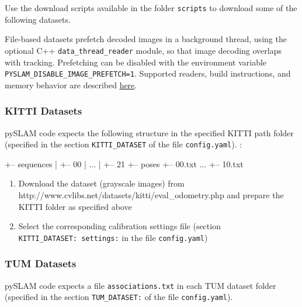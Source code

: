 \documentclass{article}
\newenvironment{Shaded}{\begin{snugshade}}{\end{snugshade}}
\newcommand{\NormalTok}[1]{\textcolor[rgb]{0.74,0.68,0.62}{#1}}
\begin{document}
Use the download scripts available in the folder \texttt{scripts} to
download some of the following datasets.

File-based datasets prefetch decoded images in a background thread, using the optional C++ \texttt{data\_thread\_reader} module, so that image decoding overlaps with tracking. Prefetching can be disabled with the environment variable \texttt{PYSLAM\_DISABLE\_IMAGE\_PREFETCH=1}. Supported readers, build instructions, and memory behavior are described \href{https://github.com/luigifreda/pyslam/blob/master/cpp/modules/data_thread_reader/README.md}{here}.

\hypertarget{kitti-datasets}{%
\subsubsection{KITTI Datasets}\label{kitti-datasets}}

pySLAM code expects the following structure in the specified KITTI path
folder (specified in the section \texttt{KITTI\_DATASET} of the file
\texttt{config.yaml}). :

\begin{scriptsize}
\begin{Shaded}
\begin{Highlighting}[]
\NormalTok{+-- sequences}
\NormalTok{|   +-- 00}
\NormalTok{|   ...}
\NormalTok{|   +-- 21}
\NormalTok{+-- poses}
\NormalTok{    +-- 00.txt}
\NormalTok{    ...}
\NormalTok{    +-- 10.txt}
\end{Highlighting}
\end{Shaded}
\end{scriptsize}

\begin{enumerate}
\def\labelenumi{\arabic{enumi}.}
\item
  Download the dataset (grayscale images) from
  http://www.cvlibs.net/datasets/kitti/eval\_odometry.php and prepare
  the KITTI folder as specified above
\item
  Select the corresponding calibration settings file (section
  \texttt{KITTI\_DATASET:\ settings:} in the file \texttt{config.yaml})
\end{enumerate}

\hypertarget{tum-datasets}{%
\subsubsection{TUM Datasets}\label{tum-datasets}}

pySLAM code expects a file \texttt{associations.txt} in each TUM dataset
folder (specified in the section \texttt{TUM\_DATASET:} of the file
\texttt{config.yaml}).
\end{document}
